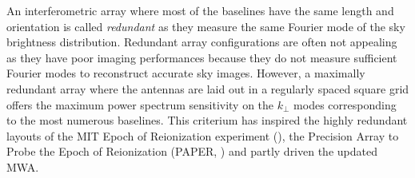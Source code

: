 An interferometric array where most of the baselines have the same length and orientation is called {\it redundant} as they measure the same Fourier mode of the sky brightness distribution. Redundant array configurations are often not appealing as they have poor imaging performances because they do not measure sufficient Fourier modes to reconstruct accurate sky images. However, a maximally redundant array where the antennas are laid out in a regularly spaced square grid offers the maximum power spectrum sensitivity on the $k_\perp$ modes corresponding to the most numerous baselines. This criterium has inspired the highly redundant layouts of the MIT Epoch of Reionization experiment (\cite{zheng14}), the Precision Array to Probe the Epoch of Reionization (PAPER, \cite{parsons12b}) and partly driven the updated MWA.

